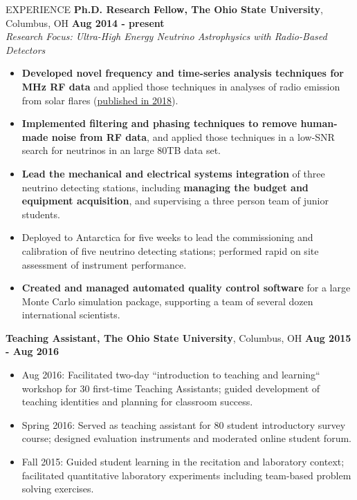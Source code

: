 \documentclass{resume} %
\begin{document}
\begin{rSection}{EXPERIENCE}
{\bf Ph.D. Research Fellow, The Ohio State University}, Columbus, OH \hfill {\bf Aug 2014 - present}\\
{\em Research Focus: Ultra-High Energy Neutrino Astrophysics with Radio-Based Detectors}
\begin{itemize}
\vspace*{.05in}
\item {\bf Developed novel frequency and time-series analysis techniques for MHz RF data} and applied those techniques in analyses of radio emission from solar flares (\href{https://arxiv.org/abs/1807.03335}{published in 2018}).
\item {\bf Implemented filtering and phasing techniques to remove human-made noise from RF data}, and applied those techniques in a low-SNR search for neutrinos in an large 80TB data set. 
\item {\bf Lead the mechanical and electrical systems integration} of three neutrino detecting stations, including {\bf managing the budget and equipment acquisition}, and supervising a three person team of junior students.
\item Deployed to Antarctica for five weeks to lead the commissioning and calibration of five neutrino detecting stations; performed rapid on site assessment of instrument performance.
\item {\bf Created and managed automated quality control software} for a large Monte Carlo simulation package, supporting a team of several dozen international scientists.
\end{itemize}

{\bf Teaching Assistant, The Ohio State University}, Columbus, OH \hfill {\bf Aug 2015 - Aug 2016}
\begin{itemize}
\item Aug 2016: Facilitated two-day ``introduction to teaching and learning`` workshop for 30 first-time Teaching Assistants; guided development of teaching identities and planning for classroom success.
\item Spring 2016: Served as teaching assistant for 80 student introductory survey course; designed evaluation instruments and moderated online student forum.
\item Fall 2015: Guided student learning in the recitation and laboratory context; facilitated quantitative laboratory experiments including team-based problem solving exercises.

\end{itemize}

\end{rSection}
\end{document}
